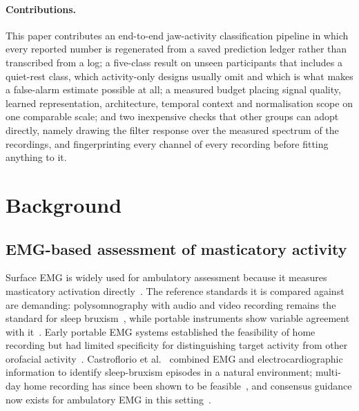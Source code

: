 \documentclass[pdflatex,sn-nature,iicol]{sn-jnl}
\begin{document}
\paragraph{Contributions.} This paper contributes an end-to-end jaw-activity classification pipeline in which every reported number is regenerated from a saved prediction ledger rather than transcribed from a log; a five-class result on unseen participants that includes a quiet-rest class, which activity-only designs usually omit and which is what makes a false-alarm estimate possible at all; a measured budget placing signal quality, learned representation, architecture, temporal context and normalisation scope on one comparable scale; and two inexpensive checks that other groups can adopt directly, namely drawing the filter response over the measured spectrum of the recordings, and fingerprinting every channel of every recording before fitting anything to it.

\section{Background}

\subsection{EMG-based assessment of masticatory activity}

Surface EMG is widely used for ambulatory assessment because it measures masticatory activation directly~\cite{raez2006techniques,farella2008masticatory}. The reference standards it is compared against are demanding: polysomnography with audio and video recording remains the standard for sleep bruxism~\cite{lavigne1996sleep,stuginski2016detection}, while portable instruments show variable agreement with it~\cite{casett2017validity,cidverdejo2024instrumental}. Early portable EMG systems established the feasibility of home recording but had limited specificity for distinguishing target activity from other orofacial activity~\cite{stuginski2016detection}. Castroflorio et al.~\cite{castroflorio2013use,castroflorio2014detection} combined EMG and electrocardiographic information to identify sleep-bruxism episodes in a natural environment; multi-day home recording has since been shown to be feasible~\cite{colonna2023electromyographic}, and consensus guidance now exists for ambulatory EMG in this setting~\cite{lobbezoo2020consensus}.
\end{document}
